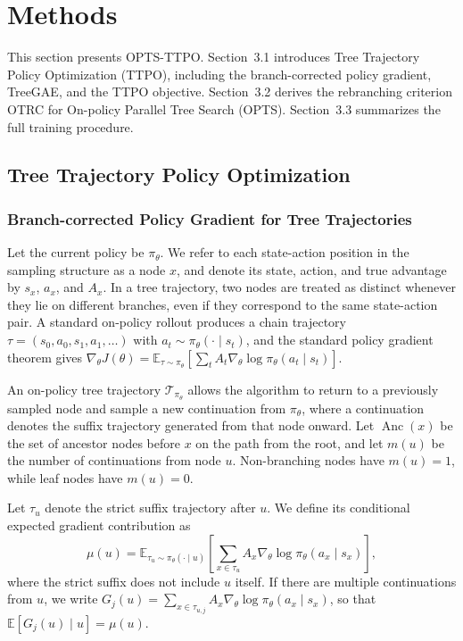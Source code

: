 \section{Methods}

This section presents OPTS-TTPO. Section~3.1 introduces Tree Trajectory Policy Optimization (TTPO), including the branch-corrected policy gradient, TreeGAE, and the TTPO objective. Section~3.2 derives the rebranching criterion OTRC for On-policy Parallel Tree Search (OPTS). Section~3.3 summarizes the full training procedure.

\subsection{Tree Trajectory Policy Optimization}

\subsubsection{Branch-corrected Policy Gradient for Tree Trajectories}

Let the current policy be $\pi_\theta$. We refer to each state-action position in the sampling structure as a node $x$, and denote its state, action, and true advantage by $s_x$, $a_x$, and $A_x$. In a tree trajectory, two nodes are treated as distinct whenever they lie on different branches, even if they correspond to the same state-action pair. A standard on-policy rollout produces a chain trajectory $\tau=(s_0,a_0,s_1,a_1,\ldots)$ with $a_t\sim\pi_\theta(\cdot\mid s_t)$, and the standard policy gradient theorem gives $\nabla_\theta J(\theta)=\mathbb{E}_{\tau\sim\pi_\theta}[\sum_t A_t\nabla_\theta\log\pi_\theta(a_t\mid s_t)]$.

An on-policy tree trajectory $\mathcal{T}_{\pi_\theta}$ allows the algorithm to return to a previously sampled node and sample a new continuation from $\pi_\theta$, where a continuation denotes the suffix trajectory generated from that node onward. Let $\operatorname{Anc}(x)$ be the set of ancestor nodes before $x$ on the path from the root, and let $m(u)$ be the number of continuations from node $u$. Non-branching nodes have $m(u)=1$, while leaf nodes have $m(u)=0$.

Let $\tau_u$ denote the strict suffix trajectory after $u$. We define its conditional expected gradient contribution as
\[
\mu(u)
=
\mathbb{E}_{\tau_u\sim \pi_\theta(\cdot\mid u)}
\left[
\sum_{x\in\tau_u}
A_x\nabla_\theta\log\pi_\theta(a_x\mid s_x)
\right],
\]
where the strict suffix does not include $u$ itself. If there are multiple continuations from $u$, we write $G_j(u)=\sum_{x\in\tau_{u,j}} A_x\nabla_\theta\log\pi_\theta(a_x\mid s_x)$, so that $\mathbb{E}[G_j(u)\mid u]=\mu(u)$.

